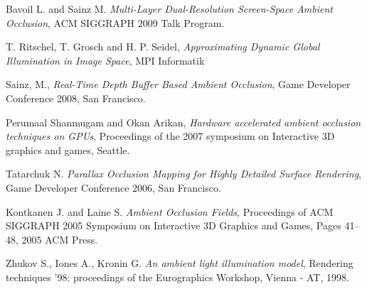 \documentclass{article}
\begin{document}
\begin{thebibliography}{9}

 Bavoil L. and Sainz M.
\textit{Multi-Layer Dual-Resolution Screen-Space Ambient Occlusion},
ACM SIGGRAPH 2009 Talk Program.

 T. Ritschel, T. Grosch and H. P. Seidel,
\textit{Approximating Dynamic Global Illumination in Image Space}, MPI Informatik
                                                                                             
 Sainz, M.,
\textit{Real-Time Depth Buffer Based Ambient Occlusion}, 
Game Developer Conference 2008, San Francisco.

 Perumaal Shanmugam and Okan Arikan,
\textit{Hardware accelerated ambient occlusion techniques on GPUs},
Proceedings of the 2007 symposium on Interactive 3D graphics and games, Seattle.  

 Tatarchuk N.
\textit{Parallax Occlusion Mapping for Highly Detailed Surface Rendering},
Game Developer Conference 2006, San Francisco.

 Kontkanen J. and Laine S. 
\textit{Ambient Occlusion Fields}, 
Proceedings of ACM SIGGRAPH 2005 Symposium on Interactive 3D Graphics and Games,
Pages 41--48, 2005 ACM Press.

 Zhukov S., Iones A., Kronin G. 
\textit{An ambient light illumination model}, Rendering techniques '98:
proceedings of the Eurographics Workshop, Vienna - AT, 1998.

\end{thebibliography}

\end{document}
